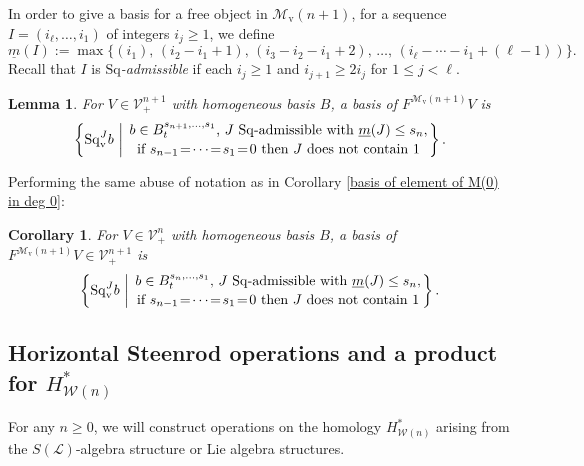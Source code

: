 \documentclass[11pt]{amsart} \renewcommand{\baselinestretch}{1.2}
\theoremstyle{plain}
\newtheorem{lem}[thm]{Lemma}
\newtheorem{cor}[thm]{Corollary}
\numberwithin{equation}{section} %
\theoremstyle{plain}
\newtheorem{lem}[thm]{Lemma}
\newtheorem{cor}[thm]{Corollary}
\numberwithin{equation}{chapter} %
\newcommand{\scrL}{\mathscr{L}}
\newcommand{\calV}{\mathcal{V}}
\newcommand{\calw}{\mathcal{W}}
\newcommand{\calMv}{\mathcal{M}\dver}
\newcommand{\LieOperad}{{\scrL}}
\newcommand{\vect}[2]{\calV^{#1}_{#2}}
\newcommand{\minDimSq}{\underline{m}}
\newcommand{\Sq}{\mathrm{Sq}}
\newcommand{\dver}{_\mathrm{v}}
\newcommand{\SubsectionOrSection}[1]{\subsection{#1}}
\begin{document}
\begin{Cohomology Operations for W and U}
In order to give a basis for a free object in $\calMv(n+1)$, for a sequence $I=(i_\ell,\ldots,i_1)$ of integers $i_j\geq1$, we define
\[\minDimSq(I):=\max\{(i_1),\,(i_2-i_1+1),\,(i_3-i_2-i_1+2),\,\ldots,\,(i_{\ell}-\cdots-i_1+(\ell-1))\}.
\]
Recall that $I$ is \emph{$\Sq$-admissible} if each $i_j\geq1$ and $i_{j+1}\geq 2i_j$ for $1\leq j <\ell$.
\begin{lem}
\label{basis of element of M(n+1)}
For $V\in\vect{n+1}{+}$ with homogeneous basis $B$, a basis of $F^{\calMv(n+1)}V$ is
\[\left\{\Sq\dver^Jb\ \middle|\ \genfrac{}{}{0pt}{}{b\in B^{s_{n+1},\ldots,s_1}_t\textup{, $J$ $\Sq$-admissible with }\minDimSq(J)\leq s_n,}{\textup{if }s_{n-1}\!=\!\cdots\!=\!s_1\!=\!0\textup{ then $J$ does not contain 1}}\right\}.\]
\end{lem}
Performing the same abuse of notation as in Corollary \ref{basis of element of M(0) in deg 0}:
\begin{cor}
\label{basis of element of M(n+1) in deg 0}
For $V\in\vect{n}{+}$ with homogeneous basis $B$, a basis of $F^{\calMv(n+1)}V\in\vect{n+1}{+}$ is
\[\left\{\Sq\dver^Jb\ \middle|\ \genfrac{}{}{0pt}{}{b\in B^{s_{n},\ldots,s_1}_t\textup{, $J$ $\Sq$-admissible with }\minDimSq(J)\leq s_n,}{\textup{if }s_{n-1}\!=\!\cdots\!=\!s_1\!=\!0\textup{ then $J$ does not contain 1}}\right\}.\]
\end{cor}

\SubsectionOrSection{Horizontal Steenrod operations and a product for $H^*_{\calw(n)}$}\label{Horizontal Steenrod operations and a product for HWn}
For any $n\geq 0$, we will construct operations on the homology $H^*_{\calw(n)}$ arising from the $S(\LieOperad)$-algebra structure or Lie algebra structures.


\end{Cohomology Operations for W and U}
\end{document}

